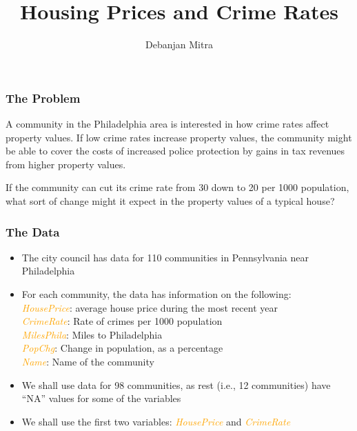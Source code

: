 \documentclass[10pt]{beamer}
\title{\sc Housing Prices and Crime Rates}    %
\author{\sc Debanjan Mitra}
\institute{\sc Indian Institute of Management Udaipur}      %
\date{}                    %
\theoremstyle{plain}
\begin{document}
\begin{frame}
  \titlepage
\end{frame}



\begin{frame}
\frametitle{\sc The Problem}
	A community in the Philadelphia area is interested in how crime rates affect property values. If low crime rates increase property values, the community might be able to cover the costs of increased police protection by gains in tax revenues from higher property values. 
	\vskip 0.2in 
	
	If the community can cut its crime rate from 30 down to 20 per 1000 population, what sort of change might it expect in the property values of a typical house? 
\end{frame}


\begin{frame}
\frametitle{\sc The Data}
	\begin{itemize}
		\item The city council has data for 110 communities in Pennsylvania near Philadelphia
		\item For each community, the data has information on the following: \\
		\textcolor{orange}{\textit{HousePrice}}: average house price during the most recent year \\
		\textcolor{orange}{\textit{CrimeRate}}: Rate of crimes per 1000 population \\
		\textcolor{orange}{\textit{MilesPhila}}: Miles to Philadelphia \\
		\textcolor{orange}{\textit{PopChg}}: Change in population, as a percentage \\
		\textcolor{orange}{\textit{Name}}: Name of the community \\
		\item We shall use data for 98 communities, as rest (i.e., 12 communities) have ``NA'' values for some of the variables
		\item We shall use the first two variables: \textcolor{orange}{\textit{HousePrice}} and \textcolor{orange}{\textit{CrimeRate}}
    \end{itemize}		
\end{frame}
\end{document}
